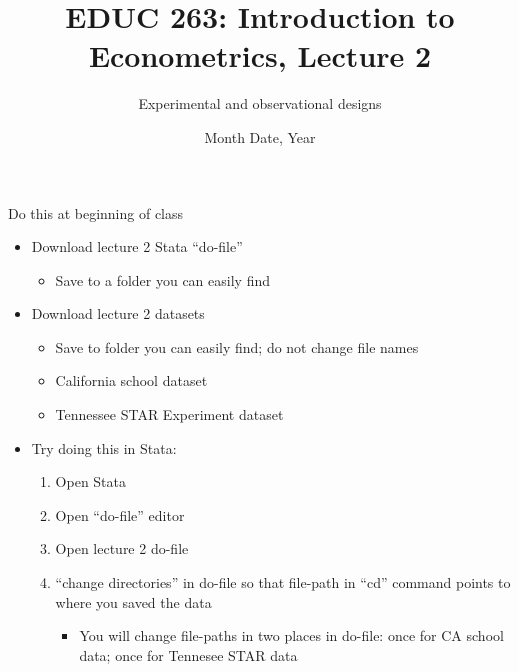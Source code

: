 
 

%


\title[EDUC 263, Lecture 2] {EDUC 263: Introduction to Econometrics, Lecture 2}
\subtitle{Experimental and observational designs}
\date{Month Date, Year}



\begin{frame}{Do this at beginning of class}
	\begin{itemize}

		\item Download lecture 2 Stata ``do-file'' \href{https://www.dropbox.com/s/qou0320ctms7gcw/intro-econometrics-lecture-2-do-file.do?dl=0}{}
		\begin{itemize}
			\item Save to a folder you can easily find
		\end{itemize}
	
		\item Download lecture 2 datasets
		\begin{itemize}
			\item Save to folder you can easily find; do not change file names
			\item California school dataset \href{https://www.dropbox.com/s/zudnfqugke33onf/caschool-v2.dta?dl=0}{}
			\item Tennessee STAR Experiment dataset  \href{https://www.dropbox.com/s/784ej11tn8q9ykk/STAR_Students.dta?dl=0}{}
		\end{itemize}
		\vspace{4mm}		 
		\item Try doing this in Stata:
		\begin{enumerate}
			\item Open Stata
			\item Open ``do-file'' editor
			\item Open lecture 2 do-file
			\item ``change directories'' in do-file so that file-path in ``cd'' command points to where you saved the data
			\begin{itemize}
				\item You will change file-paths in two places in do-file: once for CA school data; once for Tennesee STAR data
			\end{itemize}
			
		\end{enumerate}
		
	\end{itemize}
\end{frame}

